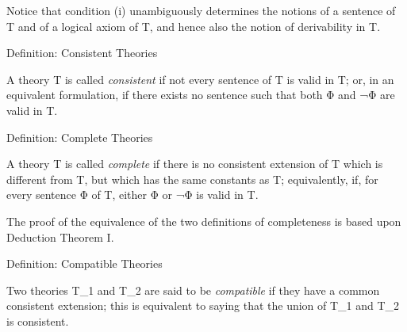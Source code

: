Notice that condition (i) unambiguously determines the notions of a
sentence of T and of a logical axiom of T, and hence also the notion of
derivability in T.

\protect\hypertarget{anchor-35}{}{}Definition: Consistent Theories

A theory T is called \emph{consistent} if not every sentence of T is
valid in T; or, in an equivalent formulation, if there exists no
sentence such that both Φ and ¬Φ are valid in T.

\protect\hypertarget{anchor-36}{}{}Definition: Complete Theories

A theory T is called \emph{complete} if there is no consistent extension
of T which is different from T, but which has the same constants as T;
equivalently, if, for every sentence Φ of T, either Φ or ¬Φ is valid in
T.

The proof of the equivalence of the two definitions of completeness is
based upon Deduction Theorem I.

\protect\hypertarget{anchor-37}{}{}Definition: Compatible Theories

Two theories T\_1 and T\_2 are said to be \emph{compatible} if they have
a common consistent extension; this is equivalent to saying that the
union of T\_1 and T\_2 is consistent.